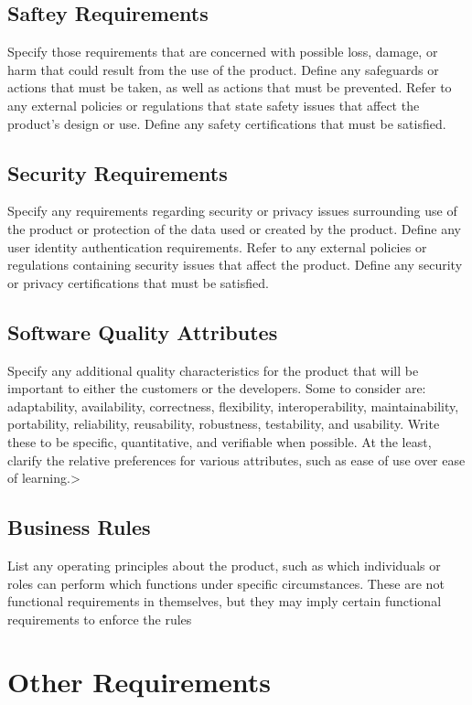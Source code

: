 \documentclass{scrreprt}
\begin{document}
    \section{Saftey Requirements}
    Specify those requirements that are concerned with possible loss, damage, or harm that could result from the use of the product. Define any safeguards or actions that must be taken, as well as actions that must be prevented. Refer to any external policies or regulations that state safety issues that affect the product’s design or use. Define any safety certifications that must be satisfied. 
    \section{Security Requirements}
    Specify any requirements regarding security or privacy issues surrounding use of the product or protection of the data used or created by the product. Define any user identity authentication requirements. Refer to any external policies or regulations containing security issues that affect the product. Define any security or privacy certifications that must be satisfied. 
    \section{Software Quality Attributes}
    Specify any additional quality characteristics for the product that will be important to either the customers or the developers. Some to consider are: adaptability, availability, correctness, flexibility, interoperability, maintainability, portability, reliability, reusability, robustness, testability, and usability. Write these to be specific, quantitative, and verifiable when possible. At the least, clarify the relative preferences for various attributes, such as ease of use over ease of learning.>  
    \section{Business Rules} 
    List any operating principles about the product, such as which individuals or roles can perform which functions under specific circumstances. These are not functional requirements in themselves, but they may imply certain functional requirements to enforce the rules
    \chapter{Other Requirements}
    
\end{document}

